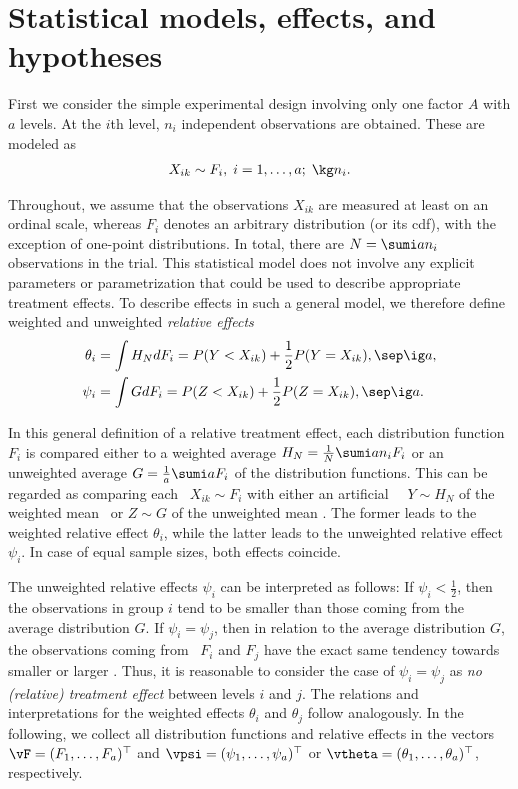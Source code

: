 \section{Statistical models, effects, and hypotheses} \label{mod}

First we consider the simple experimental design involving only one factor $A$ 
with $a$ levels. At the $i$th level, $n_i$ independent observations are 
obtained. These are modeled as 
\begin{eqnarray}
X_{ik} \sim F_i, \; i=1,\ldots,a; \; \kg n_i. \label{model1}
\end{eqnarray}

Throughout, we assume that the observations $X_{ik}$ are measured at least on 
an ordinal scale, whereas $F_i$ denotes an arbitrary distribution (or its cdf), 
with the exception of one-point distributions. In total, there are $N = \sumi 
a n_i$ observations in the trial. This statistical model does not involve any 
explicit parameters or parametrization that could be used to describe 
appropriate treatment effects. To describe effects in such a general model, we 
therefore define weighted and unweighted \textit{relative effects}
\begin{align} 
\theta_i &= \int H_N dF_i = P(Y<X_{ik})+\frac{1}{2}P(Y=X_{ik}), \sep \ig a, 
\label{thetaidef} \\
\psi_i &= \int G dF_i = P(Z<X_{ik})+\frac{1}{2}P(Z=X_{ik}), \sep \ig a. 
\label{psiidef}
\end{align}

In this general definition of a relative treatment effect, each distribution 
function $F_i$ is compared either to a weighted average $H_N = \frac1N \sumi a 
n_i F_i$ or an unweighted average $G = \frac1a \sumi a F_i$ of the distribution 
functions. This can be regarded as comparing each \obs\ $X_{ik} \sim F_i$ with 
either an artificial \ind\ \obs\ $Y \sim H_N$ of the weighted mean \db\ or $Z 
\sim G$ of the unweighted mean \db. The former leads to the weighted relative 
effect $\theta_i$, while the latter leads to the unweighted relative effect 
$\psi_i$. In case of equal sample sizes, both effects coincide. 

The unweighted relative effects $\psi_i$ can be interpreted as follows: If 
$\psi_i < \frac12$, then the observations in group $i$ tend to be smaller than 
those coming from the average distribution $G$. If $\psi_i = \psi_j$, then in 
relation to the average distribution $G$, the observations coming from \dbs\ 
$F_i$ and $F_j$ have the exact same tendency towards smaller or larger \obss. 
Thus, it is reasonable to consider the case of $\psi_i= \psi_j$ as \textit{no 
(relative) treatment effect} between levels $i$ and $j$. The relations and 
interpretations for the weighted effects $\theta_i$ and $\theta_j$ follow 
analogously. In the following, we collect all distribution functions and 
relative effects in the vectors $\vF = (F_1,\ldots, F_a)^\top$ and $\vpsi = 
(\psi_1,\ldots, \psi_a)^\top$ or $\vtheta = (\theta_1, \ldots, \theta_a)^\top$, 
respectively. 

